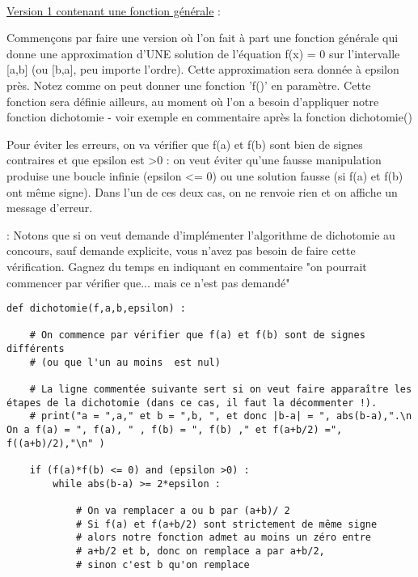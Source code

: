 \begin{correction}


	\\

	\nipuce  \ul{Version 1 contenant une fonction générale} :


	Commençons par  faire une version où l'on fait à part une fonction générale qui donne une approximation d'UNE solution de l'équation f(x) = 0 sur l'intervalle [a,b] (ou [b,a], peu importe l'ordre). Cette approximation sera donnée à epsilon près. Notez comme on peut donner une fonction 'f()' en paramètre. Cette fonction sera définie ailleurs, au moment où l'on a besoin d'appliquer notre fonction dichotomie - voir exemple en commentaire après la fonction dichotomie()

	Pour éviter les erreurs, on va vérifier que f(a) et f(b) sont bien de signes contraires et que epsilon est >0 : on veut éviter qu'une fausse manipulation produise une boucle infinie (epsilon <= 0) ou une solution fausse (si f(a) et f(b) ont même signe). Dans l'un de ces deux cas, on ne renvoie rien et on affiche un message d'erreur.

	 : Notons que si on veut demande d'implémenter l'algorithme de dichotomie au concours, sauf demande explicite, vous n'avez pas besoin de faire cette vérification. Gagnez du temps en indiquant en commentaire "on pourrait commencer par vérifier que... mais ce n'est pas demandé"

	\begin{verbatim}
def dichotomie(f,a,b,epsilon) :

    # On commence par vérifier que f(a) et f(b) sont de signes différents
    # (ou que l'un au moins  est nul)

    # La ligne commentée suivante sert si on veut faire apparaître les étapes de la dichotomie (dans ce cas, il faut la décommenter !).
    # print("a = ",a," et b = ",b, ", et donc |b-a| = ", abs(b-a),".\n On a f(a) = ", f(a), " , f(b) = ", f(b) ," et f(a+b/2) =", f((a+b)/2),"\n" )

    if (f(a)*f(b) <= 0) and (epsilon >0) :
        while abs(b-a) >= 2*epsilon :

            # On va remplacer a ou b par (a+b)/ 2
            # Si f(a) et f(a+b/2) sont strictement de même signe
            # alors notre fonction admet au moins un zéro entre
            # a+b/2 et b, donc on remplace a par a+b/2,
            # sinon c'est b qu'on remplace


\end{verbatim}
\end{correction}
